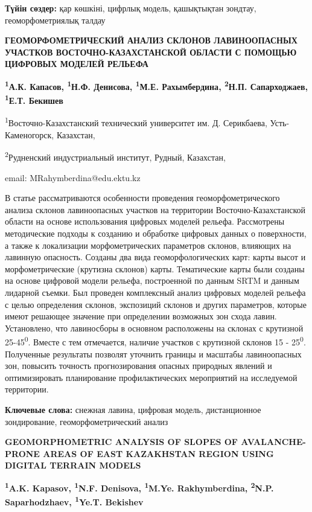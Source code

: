 {\bfseries Түйін сөздер:} қар көшкіні, цифрлық модель, қашықтықтан зондтау,
геоморфометриялық талдау

\begin{articleheader}
{\bfseries ГЕОМОРФОМЕТРИЧЕСКИЙ АНАЛИЗ СКЛОНОВ ЛАВИНООПАСНЫХ УЧАСТКОВ ВОСТОЧНО-КАЗАХСТАНСКОЙ ОБЛАСТИ С ПОМОЩЬЮ ЦИФРОВЫХ МОДЕЛЕЙ РЕЛЬЕФА}

{\bfseries
\textsuperscript{1}А.К. Капасов,
\textsuperscript{1}Н.Ф. Денисова,
\textsuperscript{1}М.Е. Рахымбердина\textsuperscript{\envelope },
\textsuperscript{2}Н.П. Сапарходжаев,
\textsuperscript{1}Е.Т. Бекишев
}
\end{articleheader}

\begin{affiliation}
\textsuperscript{1}Восточно-Казахстанский технический университет им. Д. Серикбаева, Усть-Каменогорск, Казахстан,

\textsuperscript{2}Рудненский индустриальный институт, Рудный, Казахстан,

email: MRahymberdina@edu.ektu.kz
\end{affiliation}

В статье рассматриваются особенности проведения геоморфометрического
анализа склонов лавиноопасных участков на территории
Восточно-Казахстанской области на основе использования цифровых моделей
рельефа. Рассмотрены методические подходы к созданию и обработке
цифровых данных о поверхности, а также к локализации морфометрических
параметров склонов, влияющих на лавинную опасность. Созданы два вида
геоморфологических карт: карты высот и морфометрические (крутизна
склонов) карты. Тематические карты были созданы на основе цифровой
модели рельефа, построенной по данным SRTM и данным лидарной съемки. Был
проведен комплексный анализ цифровых моделей рельефа с целью определения
склонов, экспозиций склонов и других параметров, которые имеют решающее
значение при определении возможных зон схода лавин. Установлено, что
лавиносборы в основном расположены на склонах с крутизной
25-45\textsuperscript{0}. Вместе с тем отмечается, наличие участков с
крутизной склонов 15 - 25\textsuperscript{0}. Полученные результаты
позволят уточнить границы и масштабы лавиноопасных зон, повысить
точность прогнозирования опасных природных явлений и оптимизировать
планирование профилактических мероприятий на исследуемой территории.

{\bfseries Ключевые слова:} снежная лавина, цифровая модель, дистанционное
зондирование, геоморфометрический анализ

\begin{articleheader}
{\bfseries GEOMORPHOMETRIC ANALYSIS OF SLOPES OF AVALANCHE-PRONE AREAS OF EAST KAZAKHSTAN REGION USING DIGITAL TERRAIN MODELS}

{\bfseries
\textsuperscript{1}A.K. Kapasov,
\textsuperscript{1}N.F. Denisova,
\textsuperscript{1}M.Ye. Rakhymberdina\textsuperscript{\envelope },
\textsuperscript{2}N.P. Saparhodzhaev,
\textsuperscript{1}Ye.T. Bekishev
}
\end{articleheader}

